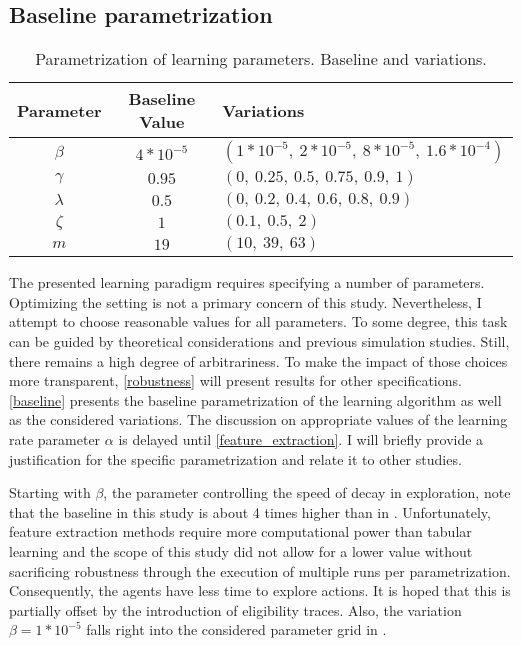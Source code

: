 \subsection{Baseline parametrization}\label{parametrization}

\begin{center}
	\begin{table}
		\begin{tabular}{|c|c|l|}
			\hline
			\textbf{Parameter}&\textbf{Baseline Value}&\textbf{Variations}\\
			\hline
			$\beta$&$4 * 10^{-5}$&$(1 * 10^{-5}, ~2 * 10^{-5}, ~8 * 10^{-5}, ~1.6 * 10^{-4})$ \\
			\hline
			$\gamma$&$0.95$&$(0, ~0.25, ~0.5, ~0.75, ~0.9, ~1)$ \\
			\hline
			$\lambda$&$0.5$&$(0, ~0.2, ~0.4, ~0.6, ~0.8, ~0.9)$ \\
			\hline
			$\zeta$&$1$&$(0.1, ~0.5, ~2)$ \\
			\hline
			$m$&$19$&$(10, ~39, ~63)$ \\
			\hline
		\end{tabular}
		\caption{Parametrization of learning parameters. Baseline and variations.}
		\label{baseline}
	\end{table}
\end{center}

The presented learning paradigm requires specifying a number of parameters. Optimizing the setting is not a primary concern of this study. Nevertheless, I attempt to choose reasonable values for all parameters. To some degree, this task can be guided by theoretical considerations and previous simulation studies. Still, there remains a high degree of arbitrariness. To make the impact of those choices more transparent, \autoref{robustness} will present results for other specifications. \autoref{baseline} presents the baseline parametrization of the learning algorithm as well as the considered variations. The discussion on appropriate values of the learning rate parameter $\alpha$ is delayed until \autoref{feature_extraction}. I will briefly provide a justification for the specific parametrization and relate it to other studies.

Starting with $\beta$, the parameter controlling the speed of decay in exploration, note that the baseline in this study is about 4 times higher than in \textcite{calvano_algorithmic_2018}.  Unfortunately, feature extraction methods require more computational power than tabular learning and the scope of this study did not allow for a lower value without sacrificing robustness through the execution of multiple runs per parametrization. Consequently, the agents have less time to explore actions. It is hoped that this is partially offset by the introduction of eligibility traces. Also, the variation $\beta = 1*10^{-5}$ falls right into the considered parameter grid in \textcite{calvano_algorithmic_2018}.


